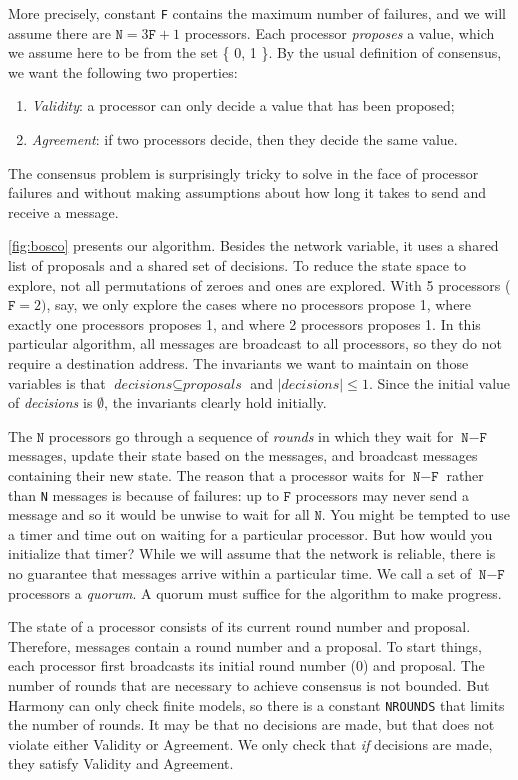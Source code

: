 \documentclass{report}
\begin{document}
More precisely,
constant \texttt{F} contains the maximum number of failures, and
we will assume there are $\texttt{N} = 3\texttt{F} + 1$ processors.
Each processor \emph{proposes} a value, which we assume here to be from the
set \{ 0, 1 \}.
By the usual definition of consensus, we want the following two properties:
\begin{enumerate}
\item \emph{Validity}: a processor can only decide a value that has been proposed;
\item \emph{Agreement}: if two processors decide, then they decide the same value.
\end{enumerate}
The consensus problem is surprisingly tricky to solve in the face of processor
failures and without making assumptions about how long it takes to send
and receive a message.

\autoref{fig:bosco} presents our algorithm.  Besides the network variable, it uses a
shared list of proposals and a shared set of decisions.
To reduce the state space to explore, not all permutations of zeroes and ones are
explored.  With 5 processors ($\mathtt{F} = 2)$, say, we only explore the cases where
no processors propose 1, where exactly one processors proposes 1, and where 2 processors
proposes 1.
In this particular algorithm, all messages are broadcast to all processors, so they do
not require a destination address.
The invariants we want to maintain
on those variables is that $\textit{decisions} \subseteq \textit{proposals}$
and $|\textit{decisions}| \leq 1$.  Since the initial value of \textit{decisions} is
$\emptyset$, the invariants clearly hold initially.

The $\mathtt{N}$ processors go through a sequence of \emph{rounds} in which they wait for
$\texttt{N} - \texttt{F}$ messages, update their state based on the messages, and
broadcast messages containing their new state.
The reason that a processor waits for $\texttt{N} - \texttt{F}$ rather than \texttt{N}
messages is because of failures: up to $\texttt{F}$ processors may never send a message
and so it would be unwise to wait for all $\texttt{N}$.  You might be tempted to use
a timer and time out on waiting for a particular processor.  But how would you initialize
that timer?  While we will assume that the network is reliable, there is no guarantee
that messages arrive within a particular time.
We call a set of $\texttt{N} - \texttt{F}$ processors a \emph{quorum}.
A quorum must suffice for the algorithm to make progress.

The state of a processor consists
of its current round number and proposal.  Therefore, messages contain
a round number and a proposal. To start things, each processor first
broadcasts its initial round number (0) and proposal.
The number of rounds that are necessary to achieve consensus is not bounded.  But
Harmony can only check finite models, so there is a constant \texttt{NROUNDS} that
limits the number of rounds.  It may be that no decisions are made, but that does not
violate either Validity or Agreement.  We only check that \emph{if} decisions are
made, they satisfy Validity and Agreement.
\end{document}
